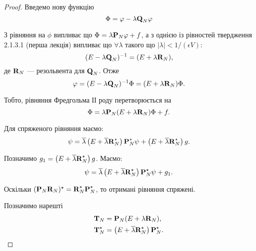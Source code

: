 \begin{proof}
	Введемо нову функцію 
	\begin{equation}
		\Phi = \phi - \lambda \bf{Q}_N \phi
	\end{equation}

	З рівняння на $\phi$ випливає що $\Phi = \lambda \bf{P}_N\phi + f$, а з однією із рівностей твердження 2.1.3.1 (перша лекція) %
	випливає що $\forall \lambda$ такого що $|\lambda| < 1 / (\epsilon V)$:
	\begin{equation}
		(E - \lambda \bf{Q}_N)^{-1} = (E + \lambda \bf{R}_N),
	\end{equation}
	де $\bf{R}_N$ --- резольвента для $\bf{Q}_N$. Отже
	\begin{equation}
		\phi = (E - \lambda \bf{Q}_N)^{-1} \Phi = (E + \lambda \bf{R}_N) \Phi.
	\end{equation}

	Тобто, рівняння Фредгольма ІІ роду перетворюється на 
	\begin{equation}
		\Phi = \lambda \bf{P}_N (E + \lambda \bf{R}_N) \Phi + f.
	\end{equation}

	Для спряженого рівняння маємо:
	\begin{equation}
		\psi = \overline \lambda \left(E + \overline \lambda \bf{R}_N^\star\right) \bf{P}_N^\star  \psi + \left(E + \overline \lambda \bf{R}_N^\star\right) g.
	\end{equation}

	Позначимо $g_1 = \left(E + \overline \lambda \bf{R}_N^\star\right) g$. Маємо:
	\begin{equation}
		\psi = \overline \lambda \left(E + \overline \lambda \bf{R}_N^\star\right) \bf{P}_N^\star  \psi + g_1.
	\end{equation}

	Оскільки $(\bf{P}_N \bf{R}_N)^\star  = \bf{R}_N^\star  \bf{P}_N^\star $, то отримані рівняння спряжені. \medskip

	Позначимо нарешті
	\begin{align}
		\bf{T}_N &= \bf{P}_N (E + \lambda \bf{R}_N), \\
		\bf{T}_N^\star &= \left(E + \overline \lambda \bf{R}_N^\star\right) \bf{P}_N^\star.
	\end{align}


\end{proof}
